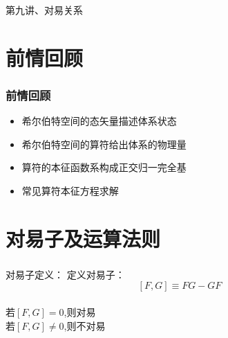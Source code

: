 \begin{frame}
    \frametitle{}
    \begin{center}
    { {\huge 第九讲、对易关系}}
    \end{center}    
\end{frame}


\section{前情回顾}

\begin{frame}
    \frametitle{前情回顾}
    \begin{itemize}
        \item 希尔伯特空间的态矢量描述体系状态
        \item 希尔伯特空间的算符给出体系的物理量
        \item 算符的本征函数系构成正交归一完全基
        \item 常见算符本征方程求解
    \end{itemize}   
\end{frame} 

\section{对易子及运算法则}
\begin{frame} 
    \frametitle{}
    \begin{tcolorbox2}{对易子定义：}
        定义对易子：$$ [F,G]\equiv FG-GF $$ \\
        若$[F,G]=0$,则对易 \\
        若$[F,G]\neq0$,则不对易  
    \end{tcolorbox2}
\end{frame} 

